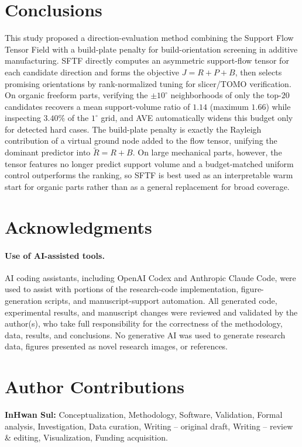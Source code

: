 \documentclass[12pt]{article}
\begin{document}
\section{Conclusions}
This study proposed a direction-evaluation method combining the Support Flow Tensor
Field with a build-plate penalty for build-orientation screening in additive
manufacturing. SFTF directly computes an asymmetric support-flow tensor for each
candidate direction and forms the objective $J=R+P+B$, then selects promising
orientations by rank-normalized tuning for slicer/TOMO verification. On organic
freeform parts, verifying the $\pm10^\circ$ neighborhoods of only the top-$20$
candidates recovers a mean support-volume ratio of $1.14$ (maximum $1.66$) while
inspecting $3.40\%$ of the $1^\circ$ grid, and AVE automatically widens this budget
only for detected hard cases. The build-plate penalty is exactly the Rayleigh
contribution of a virtual ground node added to the flow tensor, unifying the dominant
predictor into $\tilde R=R+B$. On large mechanical parts, however, the tensor features
no longer predict support volume and a budget-matched uniform control outperforms the
ranking, so SFTF is best used as an interpretable warm start for organic parts rather
than as a general replacement for broad coverage.

\section*{Acknowledgments}

\paragraph{Use of AI-assisted tools.}
AI coding assistants, including OpenAI Codex and Anthropic Claude Code, were used to
assist with portions of the research-code implementation, figure-generation scripts,
and manuscript-support automation. All generated code, experimental results, and
manuscript changes were reviewed and validated by the author(s), who take full
responsibility for the correctness of the methodology, data, results, and conclusions.
No generative AI was used to generate research data, figures presented as novel
research images, or references.

\section*{Author Contributions}
\textbf{InHwan Sul:} Conceptualization, Methodology, Software, Validation, Formal
analysis, Investigation, Data curation, Writing -- original draft, Writing --
review \& editing, Visualization, Funding acquisition.
\end{document}
